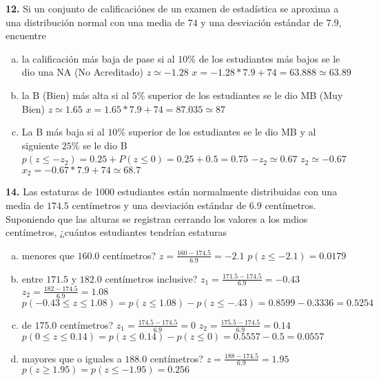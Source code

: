 \documentclass[12pt, letterpaper]{article}
\begin{document}
    \textbf{12. }Si un conjunto de calificaciónes de un examen de estadística se aproxima a una distribución normal con
    una media de $74$ y una desviación estándar de $7.9$, encuentre
        \begin{enumerate}[a)]
            \item la calificación más baja de pase si al $10\%$ de los estudiantes más bajos se le dio una NA (No Acreditado)\vskip0.5cm
                $z\simeq -1.28$\vskip0.5cm
                $x=-1.28*7.9+74=63.888\simeq 63.89$\vskip0.5cm
            \item la B (Bien) más alta si al $5\%$ superior de los estudiantes se le dio MB (Muy Bien)\vskip0.5cm
                $z\simeq 1.65$\vskip0.5cm
                $x=1.65*7.9+74=87.035\simeq 87$
            \item La B más baja si al $10\%$ superior de los estudiantes se le dio MB y al siguiente $25\%$ se le dio B\vskip0.5cm
                $p(z\leq -z_2)=0.25+P(z\leq 0)=0.25+0.5=0.75$\vskip0.5cm
                $-z_2 \simeq 0.67$\vskip0.5cm
                $z_2 \simeq -0.67$\vskip0.5cm
                $x_2=-0.67*7.9+74\simeq 68.7$

        \end{enumerate}\vskip1cm

    \textbf{14. }Las estaturas de 1000 estudiantes están normalmente distribuidas con una media de $174.5$ centímetros y
    una desviación estándar de $6.9$ centímetros. Suponiendo  que las alturas se registran cerrando los valores a los mdios
    centímetros, ¿cuántos estudiantes tendrían estaturas
        \begin{enumerate}[a)]
            \item menores que $160.0$ centímetros?\vskip0.5cm
                $z=\displaystyle\frac{160-174.5}{6.9}=-2.1$\vskip0.5cm
                $p(z\leq -2.1)=0.0179$
            \item entre $171.5$ y $182.0$ centímetros inclusive?\vskip0.5cm
                $z_1=\displaystyle\frac{171.5-174.5}{6.9}=-0.43$\vskip0.5cm
                $z_2=\displaystyle\frac{182-174.5}{6.9}=1.08$\vskip0.5cm
                $p(-0.43\leq z\leq 1.08)=p(z\leq 1.08)-p(z\leq -.43)=0.8599-0.3336=0.5254$
            \item de $175.0$ centímetros?\vskip0.5cm
                $z_1=\displaystyle\frac{174.5-174.5}{6.9}=0$\vskip0.5cm
                $z_2=\displaystyle\frac{175.5-174.5}{6.9}=0.14$\vskip0.5cm
                $p(0\leq z\leq 0.14)=p(z\leq 0.14)-p(z\leq 0)=0.5557-0.5=0.0557$
            \item mayores que o iguales a $188.0$ centímetros?\vskip0.5cm
                $z=\displaystyle\frac{188-174.5}{6.9}=1.95$\vskip0.5cm
                $p(z\geq 1.95)=p(z\leq -1.95)=0.256$
        \end{enumerate}\vskip1cm
\end{document}
